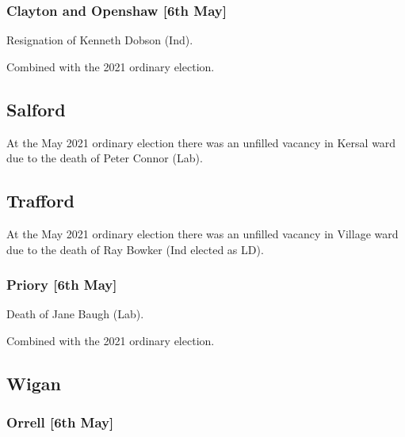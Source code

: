 \documentclass[a4paper,openany]{book}
\begin{document}
\begin{resultsiii}
\subsubsection*{Clayton and Openshaw \hspace*{\fill}\nolinebreak[1]%
	\enspace\hspace*{\fill}
	[6th May]}


Resignation of Kenneth Dobson (Ind).

Combined with the 2021 ordinary election.

\subsection*{Salford}

At the May 2021 ordinary election there was an unfilled vacancy in Kersal ward due to the death of Peter Connor (Lab).

\subsection*{Trafford}

At the May 2021 ordinary election there was an unfilled vacancy in Village ward due to the death of Ray Bowker (Ind elected as LD).

\subsubsection*{Priory \hspace*{\fill}\nolinebreak[1]%
	\enspace\hspace*{\fill}
	[6th May]}


Death of Jane Baugh (Lab).

Combined with the 2021 ordinary election.

\subsection*{Wigan}

\subsubsection*{Orrell \hspace*{\fill}\nolinebreak[1]%
	\enspace\hspace*{\fill}
	[6th May]}


\end{resultsiii}
\end{document}
